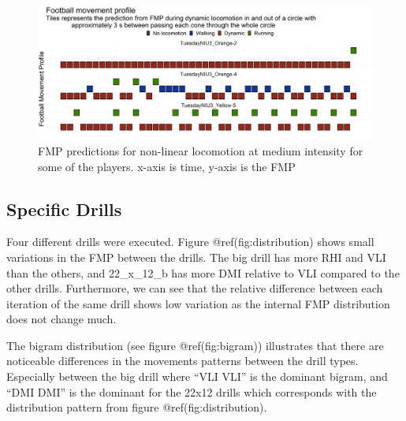 \documentclass[
]{article}
\begin{document}
\begin{figure}

{\centering \includegraphics[width=1\linewidth]{img/Tuesday_NIU3_mediumDynamic2_3} 

}

\caption{FMP predictions for non-linear locomotion at medium intensity for some of the players. x-axis is time, y-axis is the FMP}\label{fig:NIU3mediumDynamic2}
\end{figure}

\hypertarget{specific-drills}{%
\subsection{Specific Drills}\label{specific-drills}}

Four different drills were executed. Figure @ref(fig:distribution) shows
small variations in the FMP between the drills. The big drill has more
RHI and VLI than the others, and 22\_x\_12\_b has more DMI relative to
VLI compared to the other drills. Furthermore, we can see that the
relative difference between each iteration of the same drill shows low
variation as the internal FMP distribution does not change much.

The bigram distribution (see figure @ref(fig:bigram)) illustrates that
there are noticeable differences in the movements patterns between the
drill types. Especially between the big drill where ``VLI VLI'' is the
dominant bigram, and ``DMI DMI'' is the dominant for the 22x12 drills
which corresponds with the distribution pattern from figure
@ref(fig:distribution).
\end{document}
